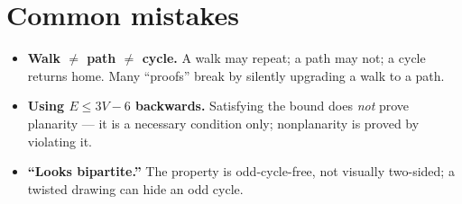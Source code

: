 \section{Common mistakes}
\begin{itemize}
\item \textbf{Walk $\ne$ path $\ne$ cycle.} A walk may repeat; a path
may not; a cycle returns home. Many ``proofs'' break by silently
upgrading a walk to a path.
\item \textbf{Using $E \le 3V-6$ backwards.} Satisfying the bound does
\emph{not} prove planarity --- it is a necessary condition only;
nonplanarity is proved by violating it.
\item \textbf{``Looks bipartite.''} The property is odd-cycle-free, not
visually two-sided; a twisted drawing can hide an odd cycle.
\end{itemize}

